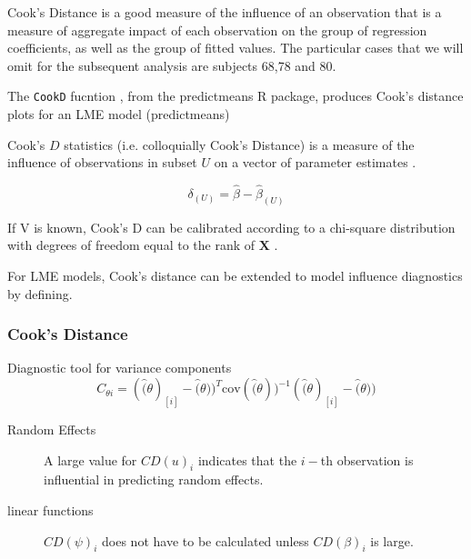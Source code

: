 \documentclass[12pt, a4paper]{report}
\theoremstyle{plain}
\theoremstyle{definition}
\theoremstyle{remark}
\begin{document}
		Cook's Distance is a good measure of the influence of an observation that is a measure of aggregate impact of each observation on the group of regression coefficients, as well as the group of fitted values.
		The particular cases that we will omit for the subsequent analysis are subjects 68,78 and 80.

		
		The \texttt{CookD} fucntion , from the predictmeans R package, produces Cook’s distance plots for an LME model 
		(predictmeans)
		
		
		
		

	 Cook's $D$ statistics (i.e. colloquially Cook's Distance) is a measure of the influence of observations in subset $U$ on a vector of parameter estimates \citep{cook77}.
	
	\[ \delta_{(U)} = \hat{\beta} - \hat{\beta}_{(U)}\]
	
	If V is known, Cook's D can be calibrated according to a chi-square distribution with degrees of freedom equal to the rank of $\boldsymbol{X}$ \citep{cpj92}.
	
	
	For LME models, Cook's distance can be extended to model influence diagnostics by defining.
	
	
	

	
	
	
	
	
\subsubsection{Cook's Distance}

Diagnostic tool for variance components
\[ C_{\theta i} =(\hat(\theta)_{[i]} - \hat(\theta))^{T}\mbox{cov}( \hat(\theta))^{-1}(\hat(\theta)_{[i]} - \hat(\theta))\]

\begin{description}
	\item[Random Effects]	
	A large value for $CD(u)_i$ indicates that the $i-$th observation is influential in predicting random effects.
	\item[linear functions]
	$CD(\psi)_i$ does not have to be calculated unless $CD(\beta)_i$ is large.
\end{description}
\end{document}
